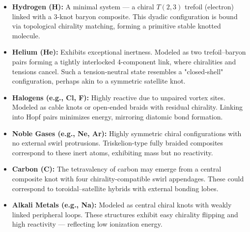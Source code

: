 \begin{itemize}
    \item \textbf{Hydrogen (H):} A minimal system — a chiral $T(2,3)$ trefoil (electron) linked with a 3-knot baryon composite. This dyadic configuration is bound via topological chirality matching, forming a primitive stable knotted molecule.

    \item \textbf{Helium (He):} Exhibits exceptional inertness. Modeled as two trefoil–baryon pairs forming a tightly interlocked 4-component link, where chiralities and tensions cancel. Such a tension-neutral state resembles a "closed-shell" configuration, perhaps akin to a symmetric satellite knot.

    \item \textbf{Halogens (e.g., Cl, F):} Highly reactive due to unpaired vortex sites. Modeled as cable knots or open-ended braids with residual chirality. Linking into Hopf pairs minimizes energy, mirroring diatomic bond formation.

    \item \textbf{Noble Gases (e.g., Ne, Ar):} Highly symmetric chiral configurations with no external swirl protrusions. Triskelion-type fully braided composites correspond to these inert atoms, exhibiting mass but no reactivity.

    \item \textbf{Carbon (C):} The tetravalency of carbon may emerge from a central composite knot with four chirality-compatible swirl appendages. These could correspond to toroidal–satellite hybrids with external bonding lobes.

    \item \textbf{Alkali Metals (e.g., Na):} Modeled as central chiral knots with weakly linked peripheral loops. These structures exhibit easy chirality flipping and high reactivity — reflecting low ionization energy.
\end{itemize}

